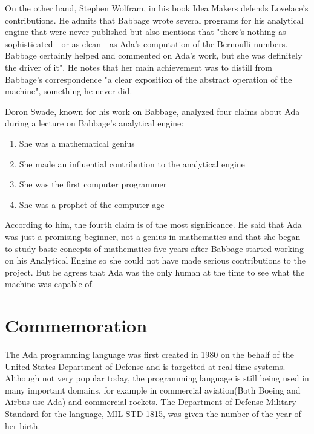 \documentclass{article}
\begin{document}
\vspace{0.3cm}

On the other hand, Stephen Wolfram, in his book Idea Makers defends Lovelace's contributions. He admits that Babbage wrote several programs for his analytical engine that were never published but also mentions that "there's nothing as sophisticated—or as clean—as Ada's computation of the Bernoulli numbers. Babbage certainly helped and commented on Ada's work, but she was definitely the driver of it". He notes that her main achievement was to distill from Babbage's correspondence "a clear exposition of the abstract operation of the machine", something he never did.

\vspace{0.3cm}

Doron Swade, known for his work on Babbage, analyzed four claims about Ada during a lecture on Babbage's analytical engine:
\begin{enumerate}
        \item She was a mathematical genius
        \item She made an influential contribution to the analytical engine
        \item She was the first computer programmer
        \item She was a prophet of the computer age
\end{enumerate}
According to him, the fourth claim is of the most significance. He said that Ada was just a promising beginner, not a genius in mathematics and that she began to study basic concepts of mathematics five years after Babbage started working on his Analytical Engine so she could not have made serious contributions to the project. But he agrees that Ada was the only human at the time to see what the machine was capable of.

\newpage

\section{Commemoration}

The Ada programming language \cite{AdaLang} was first created in 1980 on the behalf of the United States Department of Defense and is targetted at real-time systems. Although not very popular today, the programming language is still being used in many important domains, for example in commercial aviation(Both Boeing and Airbus use Ada) and commercial rockets. The Department of Defense Military Standard for the language, MIL-STD-1815, was given the number of the year of her birth.
\end{document}
